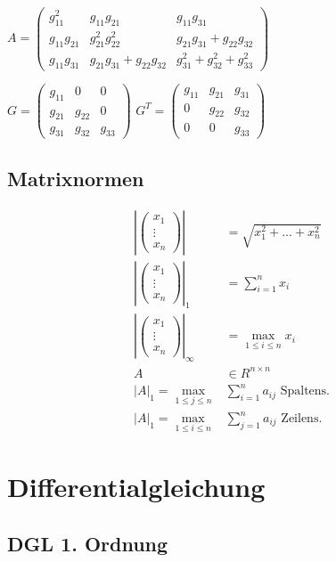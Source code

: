 \documentclass[a4paper, landscape, 10pt]{article}
\newcommand{\bspVec}{\ensuremath{\begin{pmatrix} x_1\\ \vdots \\ x_n \end{pmatrix}}}
\begin{document}
\begin{multicols}{5}
\begin{small}
			\begin{tiny}
			$A=\begin{pmatrix}
			g_{11}^{2} & g_{11}g_{21} & g_{11}g_{31}\\
			g_{11}g_{21} & g_{21}^{2}g_{22}^{2} & g_{21}g_{31}+g_{22}g_{32}\\
			g_{11}g_{31} & g_{21}g_{31}+g_{22}g_{32} & g_{31}^{2}+g_{32}^{2}+g_{33}^{2}
			\end{pmatrix}$
			\begin{multicols}{2}
				$G=\begin{pmatrix}
					g_{11} & 0 & 0\\
					g_{21} & g_{22} & 0\\
					g_{31} & g_{32} & g_{33}
				\end{pmatrix}$
			$G^{T}=\begin{pmatrix}
				g_{11} & g_{21} & g_{31}\\
				0 & g_{22} & g_{32}\\
				0 & 0 & g_{33}
			\end{pmatrix}$
			\end{multicols}
			\end{tiny}
		
			
			
		\subsection{Matrixnormen}
			\begin{align*}
				\left|\bspVec\right| &= \sqrt{x_1^2 + ... + x_n^2}\\
				\left|\bspVec\right|_1 &= \sum_{i = 1}^{n} x_i\\
				\left|\bspVec\right|_\infty &= \max_{1 \le i \le n} x_i\\
				A &\in R^{n \times n}\\
				\left|A\right|_1 = \max_{1 \le j \le n} &\sum_{i = 1}^{n} a_{ij} \text{ Spaltens.} \\
				\left|A\right|_1 = \max_{1 \le i \le n} &\sum_{j = 1}^{n} a_{ij} \text{ Zeilens.} 
			\end{align*}
	\section{Differentialgleichung}
		\subsection{DGL 1. Ordnung}	

\end{small}
\end{multicols}
\end{document}
